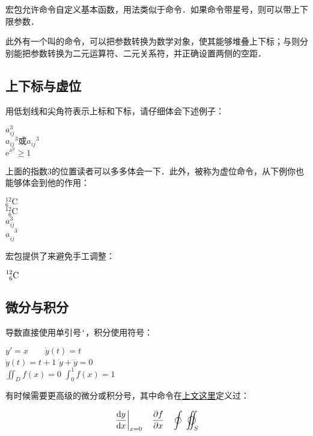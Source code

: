 宏包允许命令自定义基本函数，用法类似于命令．如果命令带星号，则可以带上下限参数．

此外有一个叫的命令，可以把参数转换为数学对象，使其能够堆叠上下标；与则分别能把参数转换为二元运算符、二元关系符，并正确设置两侧的空距．

\subsection{上下标与虚位}
用低划线和尖角符表示上标和下标，请仔细体会下述例子：

\begin{codeshow}
$a^3_{ij}$ \\
${a_{ij}}^3\text{或}a_{ij}{}^3$\\
$\mathrm{e}^{x^2}\geq 1$
\end{codeshow}

上面的指数3的位置读者可以多多体会一下．此外，被称为虚位命令，从下例你也能够体会到他的作用：

\begin{codeshow}
${}^{12}_{6}\mathrm{C}$ \\
${}^{12}_{\phantom{1}6}
\mathrm{C}$ \\
$a^3_{ij}$ \\
$a^{\phantom{ij}3}_{ij}$
\end{codeshow}

宏包提供了来避免手工调整：
\begin{codeshow}
$\prescript{12}{6}{\mathrm{C}}$
\end{codeshow}

\subsection{微分与积分}
导数直接使用单引号\verb|'|，积分使用符号：

\begin{codeshow}
$y'=x \qquad \dot{y}(t)=t$ \\
$\ddot{y}(t)=t+1$
$\dddot{y}+\ddddot{y}=0$ \\
$\iint_{D}f(x)=0$
$\int_{0}^{1}f(x)=1$
\end{codeshow}

有时候需要更高级的微分或积分号，其中命令在\hyperref[cmd:ud]{上文这里}定义过：
\begin{codeshow}
\[\left.\frac{\ud y}{\ud x}\right|_{x=0}\quad
\frac{\partial f}{\partial x}
\quad\oint\;\varoiint_S \]
\end{codeshow}

